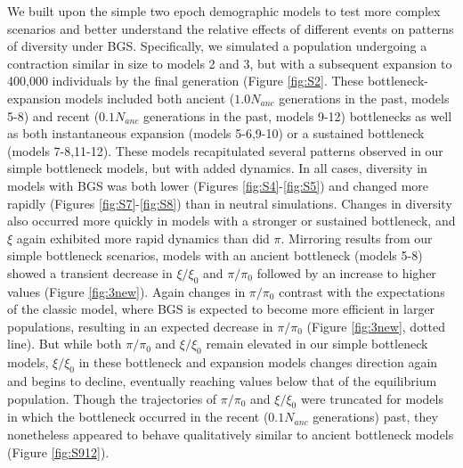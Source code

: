 \documentclass[9pt,twocolumn,twoside]{rilabRxiv}
\begin{document}
We built upon the simple two epoch demographic models  to test more complex  scenarios and better understand the relative effects of different events on patterns of diversity under BGS.
Specifically,  we simulated a population undergoing a contraction similar in size to models 2 and 3, but with a subsequent expansion to 400,000 individuals by the final generation (Figure \ref{fig:S2}.
These bottleneck-expansion models included both ancient ($1.0N_{anc}$ generations in the past, models 5-8) and recent ($0.1N_{anc}$ generations in the past, models 9-12) bottlenecks as well as both instantaneous expansion (models 5-6,9-10) or a sustained bottleneck (models 7-8,11-12).
These models recapitulated several patterns observed in our simple bottleneck models, but with added dynamics.
In all cases, diversity  in models with BGS was both lower (Figures \ref{fig:S4}-\ref{fig:S5}) and changed more rapidly (Figures \ref{fig:S7}-\ref{fig:S8}) than in neutral simulations.
Changes in diversity also occurred more quickly in models with a stronger or sustained bottleneck, and  $\xi$ again exhibited more rapid dynamics than did $\pi$.
Mirroring results from our simple bottleneck scenarios, models with an ancient bottleneck (models 5-8) showed a transient decrease in $\xi/\xi_0$ and $\pi/\pi_0$ followed by an increase to higher values (Figure \ref{fig:3new}).
Again changes in $\pi/\pi_0$ contrast with the expectations of the classic model, where  BGS is expected to become more efficient in larger populations, resulting in an expected decrease in $\pi/\pi_0$ (Figure \ref{fig:3new}, dotted line).
But while both $\pi/\pi_0$ and $\xi/\xi_0$ remain elevated in our simple bottleneck models, $\xi/\xi_0$ in these bottleneck and expansion models changes direction again and begins to decline, eventually reaching values below that of the equilibrium population.
Though the trajectories of $\pi/\pi_0$ and $\xi/\xi_0$ were truncated for models in which the bottleneck occurred in the recent ($0.1N_{anc}$ generations) past, they nonetheless appeared to behave qualitatively similar to ancient bottleneck models (Figure \ref{fig:S912}).
\end{document}

